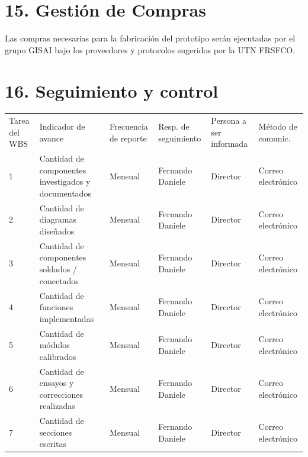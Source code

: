 \documentclass[11pt]{charter}
\begin{document}
\section{15. Gestión de Compras}
\label{sec:compras}

Las compras necesarias para la fabricación del prototipo serán ejecutadas por el grupo GISAI bajo los proveedores y protocolos sugeridos por la UTN FRSFCO.


\vspace{55px}


\section{16. Seguimiento y control}
\label{sec:seguimiento}

\begin{table}[!htpb]
\centering
\begin{tabularx}{\linewidth}{@{}|X|X|X|X|X|X|@{}}
\hline
\rowcolor[HTML]{C0C0C0} 
\multicolumn{6}{|c|}{\cellcolor[HTML]{C0C0C0}SEGUIMIENTO DE AVANCE}                                                                       \\ \hline
\rowcolor[HTML]{C0C0C0} 
Tarea del WBS & Indicador de avance & Frecuencia de reporte & Resp. de seguimiento & Persona a ser informada & Método de comunic. \\ \hline
1 & Cantidad de componentes investigados y documentados & Mensual & Fernando Daniele  & Director & Correo electrónico  \\ \hline
2 & Cantidad de diagramas diseñados & Mensual & Fernando Daniele  & Director & Correo electrónico  \\ \hline
3 & Cantidad de componentes soldados / conectados  & Mensual & Fernando Daniele  & Director & Correo electrónico  \\ \hline 
4 & Cantidad de funciones implementadas &  Mensual & Fernando Daniele  & Director & Correo electrónico  \\ \hline
5 & Cantidad de módulos calibrados & Mensual & Fernando Daniele & Director & Correo electrónico  \\ \hline
6 & Cantidad de ensayos y correcciones realizadas & Mensual & Fernando Daniele  & Director & Correo electrónico  \\ \hline
7 & Cantidad de secciones escritas & Mensual & Fernando Daniele  & Director & Correo electrónico  \\ \hline
\end{tabularx}%
\end{table}
\end{document}
